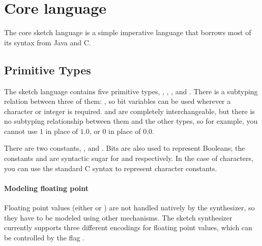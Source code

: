 \section{Core language}
The core sketch language is a simple imperative language that borrows most of its syntax from Java and C.

\subsection{Primitive Types}
The sketch language contains five primitive types, , , ,  and . There is a subtyping relation between three of them:
, so bit variables can be used wherever a character or integer is required.
 and  are completely interchangeable, but there is no subtyping relationship between them and the other types, so for example, you cannot use $1$ in place of $1.0$, or $0$ in place of $0.0$.

There are two  constants, , and . Bits are also used to represent Booleans; the constants  and  are syntactic sugar for  and  respectively. In the case of characters, you can use the standard C syntax to represent character constants.

\paragraph{Modeling floating point} Floating point values (either  or ) are not handled natively by the synthesizer, so they have to be modeled using other mechanisms. The sketch synthesizer currently supports three different encodings for floating point values, which can be controlled by the flag .



